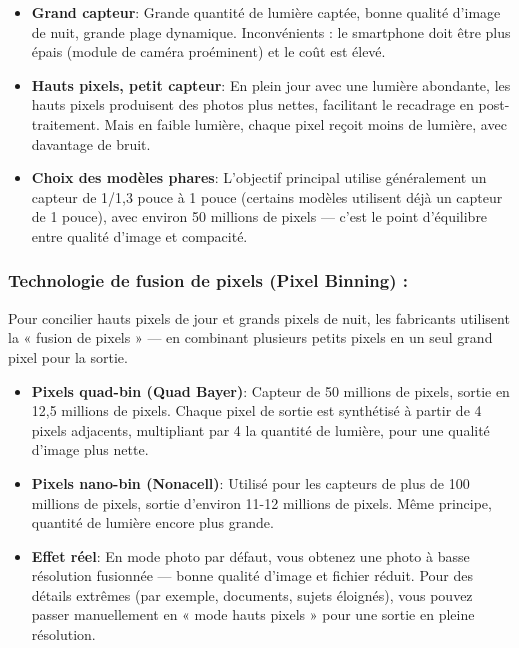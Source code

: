 \begin{itemize}
  \item \textbf{Grand capteur}: Grande quantité de lumière captée, bonne qualité d'image de nuit, grande plage dynamique. Inconvénients : le smartphone doit être plus épais (module de caméra proéminent) et le coût est élevé.
  \item \textbf{Hauts pixels, petit capteur}: En plein jour avec une lumière abondante, les hauts pixels produisent des photos plus nettes, facilitant le recadrage en post-traitement. Mais en faible lumière, chaque pixel reçoit moins de lumière, avec davantage de bruit.
  \item \textbf{Choix des modèles phares}: L'objectif principal utilise généralement un capteur de 1/1,3 pouce à 1 pouce (certains modèles utilisent déjà un capteur de 1 pouce), avec environ 50 millions de pixels — c'est le point d'équilibre entre qualité d'image et compacité.
\end{itemize}

\subsubsection*{Technologie de fusion de pixels (Pixel Binning) :}

Pour concilier hauts pixels de jour et grands pixels de nuit, les fabricants utilisent la « fusion de pixels » — en combinant plusieurs petits pixels en un seul grand pixel pour la sortie.

\begin{itemize}
  \item \textbf{Pixels quad-bin (Quad Bayer)}: Capteur de 50 millions de pixels, sortie en 12,5 millions de pixels. Chaque pixel de sortie est synthétisé à partir de 4 pixels adjacents, multipliant par 4 la quantité de lumière, pour une qualité d'image plus nette.
  \item \textbf{Pixels nano-bin (Nonacell)}: Utilisé pour les capteurs de plus de 100 millions de pixels, sortie d'environ 11-12 millions de pixels. Même principe, quantité de lumière encore plus grande.
  \item \textbf{Effet réel}: En mode photo par défaut, vous obtenez une photo à basse résolution fusionnée — bonne qualité d'image et fichier réduit. Pour des détails extrêmes (par exemple, documents, sujets éloignés), vous pouvez passer manuellement en « mode hauts pixels » pour une sortie en pleine résolution.
\end{itemize}


